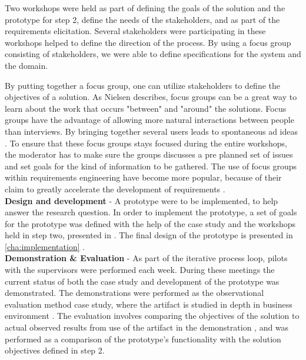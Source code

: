 Two workshops were held as part of defining the goals of the solution and the 
prototype for step 2, define the needs of the stakeholders, and as part of the 
requirements elicitation. Several stakeholders were participating in these
workshops helped to define the direction of the process. By using a focus group 
consisting of stakeholders, we were able to define specifications for the 
system and the domain. 


By putting together a focus group, one can utilize stakeholders to define the
objectives of a solution. As Nielsen \cite{FocusGroupstoStudyWorkPractice} 
describes, focus groups can be a great way to learn about the work that occurs 
"between" and "around" the solutions. Focus groups have the advantage of allowing more natural interactions between people than interviews.
By bringing together several users leads to spontaneous ad ideas \cite{nielsen1997use}. To ensure that these focus groups stays 
focused during the entire workshops, the moderator has to make sure the 
groups discusses a pre planned set of issues and set goals for the kind of 
information to be gathered. The use of focus groups within requirements 
engineering have become more popular, because of their claim to greatly 
accelerate the development of requirements \cite{goguen1993techniques}. \\

\textbf{Design and development} - A prototype were to be implemented, to help
answer the research question. In order to implement the prototype, a set of 
goals for the prototype was defined with the help of the case study and the 
workshops held in step two, presented in . The
final design of the prototype is presented in \ref{cha:implementation}
.\\


\textbf{Demonstration \& Evaluation} - As part of the iterative process loop, pilots with the supervisors were performed each week. During these meetings the current status of both the case 
study and development of the prototype was demonstrated. The demonstrations 
were performed as the observational evaluation method case study, where the 
artifact is studied in depth in business environment \cite{von2004design}. The 
evaluation involves comparing the objectives of the solution to actual 
observed results from use of the artifact in the demonstration 
\cite{peffers2006design}, and was performed as a comparison of the prototype's 
functionality with the solution objectives defined in step 2. \\




